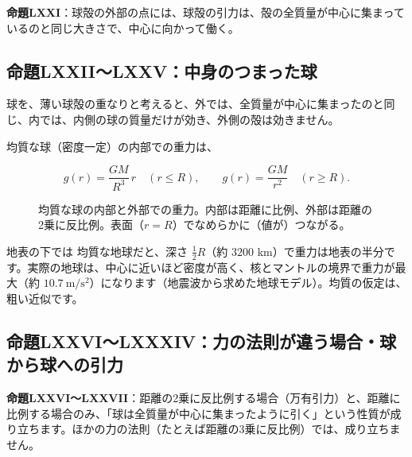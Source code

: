 \documentclass[a4paper,11pt,openany]{ltjsbook}
\begin{document}
\textbf{命題LXXI}：球殻の外部の点には、球殻の引力は、殻の全質量が中心に集まっているのと同じ大きさで、中心に向かって働く。

\subsection{命題LXXII〜LXXV：中身のつまった球}

球を、薄い球殻の重なりと考えると、外では、全質量が中心に集まったのと同じ、内では、内側の球の質量だけが効き、外側の殻は効きません。

均質な球（密度一定）の内部での重力は、

\[
g(r)=\frac{GM}{R^3}\,r\quad(r\le R),\qquad g(r)=\frac{GM}{r^2}\quad(r\ge R).
\]

\begin{figure}[htbp]
\centering
{}
\caption{均質な球の内部と外部での重力。内部は距離に比例、外部は距離の2乗に反比例。表面（$r=R$）でなめらかに（値が）つながる。}
\end{figure}

\begin{examplebox}{地表の下では}
均質な地球だと、深さ $\frac12R$（約 $3200$ km）で重力は地表の半分です。実際の地球は、中心に近いほど密度が高く、核とマントルの境界で重力が最大（約 $10.7\ \mathrm{m/s^2}$）になります（地震波から求めた地球モデル）。均質の仮定は、粗い近似です。
\end{examplebox}

\subsection{命題LXXVI〜LXXXIV：力の法則が違う場合・球から球への引力}

\textbf{命題LXXVI〜LXXVII}：距離の2乗に反比例する場合（万有引力）と、距離に比例する場合のみ、「球は全質量が中心に集まったように引く」という性質が成り立ちます。ほかの力の法則（たとえば距離の3乗に反比例）では、成り立ちません。
\end{document}
